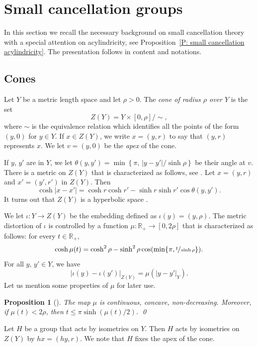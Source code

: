 \documentclass[JEP,XML,SOM,Unicode, NoEqCountersInSection,published]{cedram}
\theoremstyle{plain}
\newtheorem{prop}[thm]{Proposition}
\theoremstyle{definition}
\begin{document}
\section{Small cancellation groups}
In this section we recall the necessary background on small cancellation theory with a special attention on acylindricity, see Proposition~\ref{P: small cancellation acylindricity}.
The presentation follows \cite{coulon_geometry_2014} in content and notations.

\subsection{Cones}

Let $Y$ be a metric length space and let $\rho>0$.
The \emph{cone of radius $\rho$ over $Y$} is the set
\[
Z(Y)= Y\times [0,\rho]/\sim,
\]
where $\sim$ is the equivalence relation which identifies all the points of the form $(y,0)$ for $y \in Y$.
If $x\in Z (Y)$, we write $x=(y,r)$ to say that $(y,r)$ represents $x$. We let $v=(y,0)$ be the \emph{apex} of the cone.

If $y$, $y'$ are in $Y$, we let $\theta(y,y')=\min\left\{ \pi,\, |y-y'|/\sinh\rho\right\}$ be their angle at $v$. There is a metric on $Z(Y)$ that is characterized as follows, see \cite[Ch.\,I.5]{bridson_metric_1999}.
Let $x=(y,r)$ and $x'=(y',r')$ in $Z(Y)$. Then
\[
\cosh |x-x'| = \cosh r \cosh r' -\sinh r \sinh r' \cos \theta (y,y').
\]
It turns out that $Z(Y)$ is a hyperbolic space \cite[Prop.\,4.6]{coulon_geometry_2014}.

We let $\iota: Y \to Z(Y)$ be the embedding defined as $\iota(y)=(y,\rho)$. The metric distortion of $\iota$ is controlled by a function $\mu: \mathbb{R}_+ \to [0,2\rho]$ that is characterized as follows: for every $ t\in \mathbb{R}_+$,
\[
\cosh \mu(t) = \cosh^2 \rho - \sinh^2 \rho \cos( \min\{\pi, \sfrac t{\sinh \rho}\}).
\]
For all $y,\, y' \in Y$, we have
\begin{equation}
\label{L: distortion} |\iota(y)-\iota(y')|_{Z(Y)}=\mu(|y-y'|_Y).
\end{equation}
Let us mention some properties of $\mu$ for later use.

\begin{prop}[{\cite[Prop.\,4.4]{coulon_geometry_2014}}]\label{P: mu} The map $\mu$ is continuous, concave, non-decreasing. Moreover, if $\mu(t)< 2\rho$, then $t \leqslant \pi \sinh (\mu(t)/2)$. \qed
\end{prop}

Let $H$ be a group that acts by isometries on $Y$. Then $H$ acts by isometries on $Z(Y)$ by $hx=(hy,r)$. We note that $H$ fixes the apex of the cone.
\end{document}
